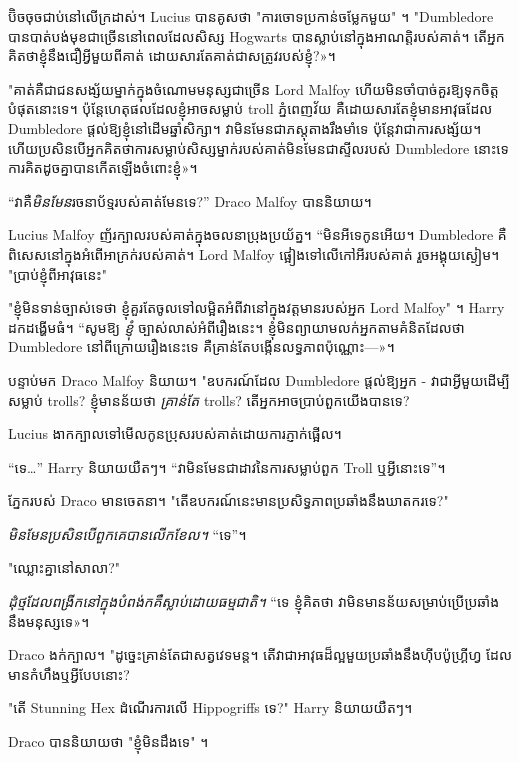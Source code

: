 {{ប៊ិច​ចុច​ជាប់​នៅ​លើ​ក្រដាស់។ Lucius បានគូសថា "ការចោទប្រកាន់ចម្លែកមួយ" ។ "Dumbledore បានបាត់បង់មុខជាច្រើននៅពេលដែលសិស្ស Hogwarts បានស្លាប់នៅក្នុងអាណត្តិរបស់គាត់។ តើ​អ្នក​គិត​ថា​ខ្ញុំ​នឹង​ជឿ​អ្វី​មួយ​ពី​គាត់ ដោយ​សារ​តែ​គាត់​ជា​សត្រូវ​របស់​ខ្ញុំ?»។

"គាត់គឺជាជនសង្ស័យម្នាក់ក្នុងចំណោមមនុស្សជាច្រើន Lord Malfoy ហើយមិនចាំបាច់គួរឱ្យទុកចិត្តបំផុតនោះទេ។ ប៉ុន្តែហេតុផលដែលខ្ញុំអាចសម្លាប់ troll ភ្នំពេញវ័យ គឺដោយសារតែខ្ញុំមានអាវុធដែល Dumbledore ផ្តល់ឱ្យខ្ញុំនៅដើមឆ្នាំសិក្សា។ វា​មិន​មែន​ជា​ភស្តុតាង​រឹងមាំ​ទេ ប៉ុន្តែ​វា​ជា​ការ​សង្ស័យ។ ហើយ​ប្រសិន​បើ​អ្នក​គិត​ថា​ការ​សម្លាប់​សិស្ស​ម្នាក់​របស់​គាត់​មិន​មែន​ជា​ស្ទីល​របស់ Dumbledore នោះ​ទេ ការ​គិត​ដូច​គ្នា​បាន​កើត​ឡើង​ចំពោះ​ខ្ញុំ»។

“វាគឺ\emph{មិនមែន}រចនាប័ទ្មរបស់គាត់មែនទេ?” Draco Malfoy បាននិយាយ។

Lucius Malfoy ញ័រក្បាលរបស់គាត់ក្នុងចលនាប្រុងប្រយ័ត្ន។ “មិនអីទេកូនអើយ។ Dumbledore គឺពិសេសនៅក្នុងអំពើអាក្រក់របស់គាត់។ Lord Malfoy ផ្អៀង​ទៅ​លើ​កៅអី​របស់​គាត់ រួច​អង្គុយ​ស្ងៀម។ "ប្រាប់ខ្ញុំពីអាវុធនេះ"

"ខ្ញុំមិនទាន់ច្បាស់ទេថា ខ្ញុំគួរតែចូលទៅលម្អិតអំពីវានៅក្នុងវត្តមានរបស់អ្នក Lord Malfoy" ។ Harry ដកដង្ហើមធំ។ “សូមឱ្យ \emph{ខ្ញុំ} ច្បាស់លាស់អំពីរឿងនេះ។ ខ្ញុំ​មិន​ព្យាយាម​លក់​អ្នក​តាម​គំនិត​ដែល​ថា Dumbledore នៅ​ពី​ក្រោយ​រឿង​នេះ​ទេ គឺ​គ្រាន់​តែ​បង្កើន​លទ្ធភាព​ប៉ុណ្ណោះ—»។

បន្ទាប់មក Draco Malfoy និយាយ។ "ឧបករណ៍ដែល Dumbledore ផ្តល់ឱ្យអ្នក - វាជាអ្វីមួយដើម្បីសម្លាប់ trolls? ខ្ញុំមានន័យថា \emph{គ្រាន់តែ} trolls? តើអ្នកអាចប្រាប់ពួកយើងបានទេ?

Lucius ងាកក្បាលទៅមើលកូនប្រុសរបស់គាត់ដោយការភ្ញាក់ផ្អើល។

“ទេ…” Harry និយាយយឺតៗ។ “វា​មិន​មែន​ជា​ដាវ​នៃ​ការ​សម្លាប់​ពួក​ Troll ឬ​អ្វី​នោះ​ទេ”។

ភ្នែករបស់ Draco មានចេតនា។ "តើឧបករណ៍នេះមានប្រសិទ្ធភាពប្រឆាំងនឹងឃាតករទេ?"

\emph{មិន​មែន​ប្រសិន​បើ​ពួក​គេ​បាន​លើក​ខែល។} “ទេ”។

"ឈ្លោះគ្នានៅសាលា?"

\emph{ដុំថ្មដែលពង្រីកនៅក្នុងបំពង់កគឺស្លាប់ដោយធម្មជាតិ។} “ទេ ខ្ញុំ​គិត​ថា វា​មិន​មាន​ន័យ​សម្រាប់​ប្រើ​ប្រឆាំង​នឹង​មនុស្ស​ទេ»។

Draco ងក់ក្បាល។ "ដូច្នេះគ្រាន់តែជាសត្វវេទមន្ត។ តើ​វា​ជា​អាវុធ​ដ៏​ល្អ​មួយ​ប្រឆាំង​នឹង​ហ៊ីបប៉ូហ្គ្រីហ្វ ដែល​មាន​កំហឹង​ឬ​អ្វី​បែប​នោះ?

"តើ Stunning Hex ដំណើរការលើ Hippogriffs ទេ?" Harry និយាយយឺតៗ។

Draco បាននិយាយថា "ខ្ញុំមិនដឹងទេ" ។

}}
